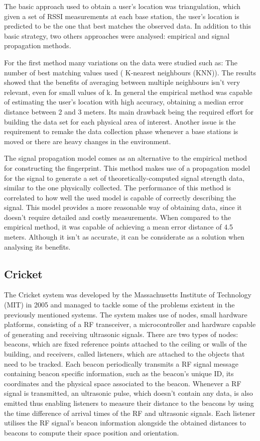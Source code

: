   
The basic approach used to obtain a user's location was triangulation, which given a set of \ac{RSSI} measurements at each base station, the user's location is predicted to be the one that best matches the observed data. In addition to this basic strategy, two others approaches were analysed: empirical and signal propagation methods.   
  
  
For the first method many variations on the data were studied such as: The number of best matching values used ( K-nearest neighbours (KNN)). The results showed that the benefits of averaging between multiple neighbours isn't very relevant, even for small values of k. In general the empirical method was capable of estimating the user's location with high accuracy, obtaining a median error distance between 2 and 3 meters. Its main drawback being the required effort for building the data set for each physical area of interest. Another issue is the requirement to remake the data collection phase whenever a base stations is moved or there are heavy changes in the environment.  
  
  
The signal propagation model comes as an alternative to the empirical method for constructing the fingerprint. This method makes use of a propagation model for the signal to generate a set of theoretically-computed signal strength data, similar to the one physically collected. The performance of this method is correlated to how well the used model is capable of correctly describing the signal. This model provides a more reasonable way of obtaining data, since it doesn't require detailed and costly measurements. When compared to the empirical method, it was capable of achieving a mean error distance of 4.5 meters. Although it isn't as accurate, it can be considerate as a solution when analysing its benefits.  
  
  
\subsection{Cricket}  
\label{subsec:cricket}  
  
  
The Cricket system\cite{cricket} was developed by the Massachusetts Institute of Technology (MIT) in 2005 and managed to tackle some of the problems existent in the previously mentioned systems. The system makes use of nodes, small hardware platforms, consisting of a RF transceiver, a microcontroller and hardware capable of generating and receiving ultrasonic signals. There are two types of nodes: beacons, which are fixed reference points attached to the ceiling or walls of the building, and receivers, called listeners, which are attached to the objects that need to be tracked. Each beacon periodically transmits a \ac{RF} signal message containing beacon specific information, such as the beacon's unique ID, its coordinates and the physical space associated to the beacon. Whenever a \ac{RF} signal is transmitted, an ultrasonic pulse, which doesn't contain any data, is also emitted thus enabling listeners to measure their distance to the beacons by using the time difference of arrival times of the RF and ultrasonic signals. Each listener utilises the RF signal's beacon information alongside the obtained distances to beacons to compute their space position and orientation.   
  
